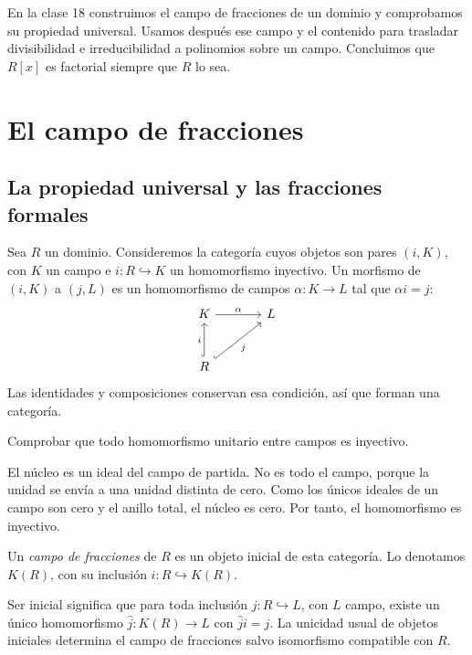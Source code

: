 En la clase 18 construimos el campo de fracciones de un dominio y comprobamos su propiedad universal. Usamos después ese campo y el contenido para trasladar divisibilidad e irreducibilidad a polinomios sobre un campo. Concluimos que $R[x]$ es factorial siempre que $R$ lo sea.

\section{El campo de fracciones}
\subsection{La propiedad universal y las fracciones formales}
Sea $R$ un dominio. Consideremos la categoría cuyos objetos son pares $(i,K)$, con $K$ un campo e $i:R\hookrightarrow K$ un homomorfismo inyectivo. Un morfismo de $(i,K)$ a $(j,L)$ es un homomorfismo de campos $\alpha:K\to L$ tal que $\alpha i=j$:
\[
\begin{tikzcd}[column sep=large,row sep=large]
K\arrow[r,"\alpha"]&L\\
R\arrow[u,hook,"i"]\arrow[ur,hook,"j"']&
\end{tikzcd}
\]
Las identidades y composiciones conservan esa condición, así que forman una categoría.

\begin{ejer}\label{ejer:C18-morfismo-campos}
Comprobar que todo homomorfismo unitario entre campos es inyectivo.
\end{ejer}
\begin{sol}
El núcleo es un ideal del campo de partida. No es todo el campo, porque la unidad se envía a una unidad distinta de cero. Como los únicos ideales de un campo son cero y el anillo total, el núcleo es cero. Por tanto, el homomorfismo es inyectivo.
\end{sol}

\begin{defi}
Un \emph{campo de fracciones} de $R$ es un objeto inicial de esta categoría. Lo denotamos $K(R)$, con su inclusión $i:R\hookrightarrow K(R)$.
\end{defi}
Ser inicial significa que para toda inclusión $j:R\hookrightarrow L$, con $L$ campo, existe un único homomorfismo $\widehat j:K(R)\to L$ con $\widehat ji=j$. La unicidad usual de objetos iniciales determina el campo de fracciones salvo isomorfismo compatible con $R$.

